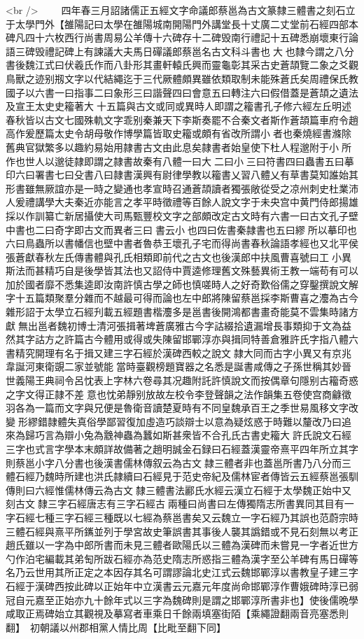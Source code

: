 <br />
　　四年春三月詔諸儒正五經文字命議郎蔡邕為古文篆隸三體書之刻石立于太學門外【雒陽記曰太學在雒陽城南開陽門外講堂長十丈廣二丈堂前石經四部本碑凡四十六枚西行尚書周易公羊傳十六碑存十二碑毁南行禮記十五碑悉崩壞東行論語三碑毁禮記碑上有諫議大夫馬日磾議郎蔡邕名古文科斗書也大也隸今謂之八分書後魏江式曰伏羲氏作而八卦形其畫軒轅氏興而靈龜彰其采古史蒼頡覽二象之爻觀鳥獸之迹别剏文字以代結繩迄于三代厥體頗異雖依類取制未能殊蒼氏矣周禮保氏教國子以六書一曰指事二曰象形三曰諧聲四曰會意五曰轉注六曰假借蓋是蒼頡之遺法及宣王太史史籕著大十五篇與古文或同或異時人即謂之籕書孔子修六經左丘明述春秋皆以古文七國殊軌文字乖别秦兼天下李斯奏罷不合秦文者斯作蒼頡篇車府令趙高作爰歷篇太史令胡母敬作博學篇皆取史籕或頗有省改所謂小者也秦燒經書滌除舊典官獄繁多以趣約易始用隷書古文由此息矣隷書者始皇使下杜人程邈附于小所作也世人以邈徒隷即謂之隷書故秦有八體一曰大二曰小三曰符書四曰蟲書五曰摹印六曰署書七曰殳書八曰隷書漢興有尉律學教以籕書乂習八體乂有草書莫知誰始其形書雖無厥誼亦是一時之變通也孝宣時召通蒼頡讀者獨張敞從受之凉州刺史杜業沛人爰禮講學大夫秦近亦能言之孝平時徵禮等百餘人說文字于未央宫中黄門侍郎揚雄採以作訓纂亡新居攝使大司馬甄豐校文字之部頗改定古文時有六書一曰古文孔子壁中書也二曰奇字即古文而異者三曰書云小也四曰佐書秦隷書也五曰繆所以摹印也六曰鳥蟲所以書幡信也壁中書者魯恭王壞孔子宅而得尚書春秋論語孝經也又北平侯張蒼獻春秋左氏傳書體與孔氏相類即前代之古文也後漢郎中扶風曹喜號曰工小異斯法而甚精巧自是後學皆其法也又詔侍中賈逵修理舊文殊藝異術王教一端苟有可以加於國者靡不悉集逵即汝南許慎古學之師也慎嗟時人之好奇歎俗儒之穿鑿撰說文解字十五篇類聚羣分雜而不越最可得而論也左中郎將陳留蔡邕採李斯曹喜之灋為古今雜形詔于太學立石經刋載五經題書楷灋多是邕書後開鴻都書畫奇能莫不雲集時諸方獻無出邕者魏初博士清河張揖著埤蒼廣雅古今字詁綴拾遺漏增長事類抑于文為益然其字詁方之許篇古今體用或得或失陳留邯鄲淳亦與揖同特善倉雅許氏字指八體六書精究開理有名于揖又建三字石經於漢碑西較之說文隷大同而古字小異又有京兆韋誕河東衛覬二家並號能當時臺觀榜題寶器之名悉是誕書咸傳之子孫世稱其妙晉世義陽王典祠令呂忱表上字林六卷尋其况趣附託許慎說文而按偶章句隱别古籕奇惑之字文得正隷不差意也忱弟靜别放故左校令李登聲韻之法作韻集五卷使宫商龣徵羽各為一篇而文字與兄便是魯衛音讀楚夏時有不同皇魏承百王之季世易風移文字改變形繆錯隷體失真俗學鄙習復加虛造巧談辯士以意為疑炫惑于時難以釐改乃曰追來為歸巧言為辯小兔為䨲神蟲為蠶如斯甚衆皆不合孔氏古書史籕大許氏說文石經三字也式言字學本末頗詳故備著之趙明誠金石録曰石經蓋漢靈帝熹平四年所立其字則蔡邕小字八分書也後漢書儒林傳叙云為古文隷三體者非也蓋邕所書乃八分而三體石經乃魏時所建也洪氏隷續曰石經見于范史帝紀及儒林宦者傳皆云五經蔡邕張馴傳則曰六經惟儒林傳云為古文隸三體書法酈氏水經云漢立石經于太學魏正始中又刻古文隸三字石經唐志有三字石經古兩種曰尚書曰左傳獨隋志所書異同其目有一字石經七種三字石經三種既以七經為蔡邕書矣又云魏立一字石經乃其誤也范蔚宗時三體石經與熹平所䥴並列于學宮故史筆誤書其事後人襲其譌錯或不見石刻無以考正趙氏雖以一字為中郎所書而未見三體者歐陽氏以三體為漢碑而未嘗見一字者近世方勺作泊宅編載其弟匋所跋石經亦為范史隋志所惑指三體為漢字至公羊碑有馬日磾等名乃云世用其所正定之本因存其名可謂謬論北史江式云魏邯鄲淳以書教皇子建三字石經于漢碑西按此碑以正始年中立漢書云元嘉元年度尚命邯鄲淳作曹娥碑時淳已弱冠自元嘉至正始亦九十餘年式以三字為魏碑則是謂之邯鄲淳所書非也】使後儒晩學咸取正焉碑始立其觀視及摹寫者車乘日千餘兩填塞街陌【乘繩證翻兩音亮塞悉則翻】　初朝議以州郡相黨人情比周【比毗至翻下同】